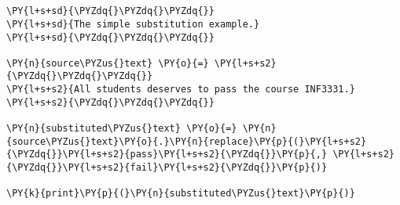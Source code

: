

\section*{}

\begin{Verbatim}[commandchars=\\\{\}]
\PY{l+s+sd}{\PYZdq{}\PYZdq{}\PYZdq{}}
\PY{l+s+sd}{The simple substitution example.}
\PY{l+s+sd}{\PYZdq{}\PYZdq{}\PYZdq{}}

\PY{n}{source\PYZus{}text} \PY{o}{=} \PY{l+s+s2}{\PYZdq{}\PYZdq{}\PYZdq{}}
\PY{l+s+s2}{All students deserves to pass the course INF3331.}
\PY{l+s+s2}{\PYZdq{}\PYZdq{}\PYZdq{}}

\PY{n}{substituted\PYZus{}text} \PY{o}{=} \PY{n}{source\PYZus{}text}\PY{o}{.}\PY{n}{replace}\PY{p}{(}\PY{l+s+s2}{\PYZdq{}}\PY{l+s+s2}{pass}\PY{l+s+s2}{\PYZdq{}}\PY{p}{,} \PY{l+s+s2}{\PYZdq{}}\PY{l+s+s2}{fail}\PY{l+s+s2}{\PYZdq{}}\PY{p}{)}

\PY{k}{print}\PY{p}{(}\PY{n}{substituted\PYZus{}text}\PY{p}{)}
\end{Verbatim}

